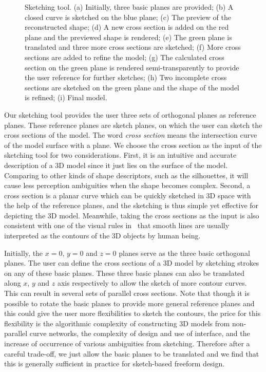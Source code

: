 \begin{figure} [htbp]
{\begin{minipage}[b]{0.26\textwidth}
    \end{minipage}}
  \caption{Sketching tool. (a) Initially, three basic planes are provided; (b) A closed curve is sketched on the blue plane; (c) The preview of the reconstructed shape; (d) A new cross section is added on the red plane and the previewed shape is rendered; (e) The green plane is translated and three more cross sections are sketched; (f) More cross sections are added to refine the model; (g) The calculated cross section on the green plane is rendered semi-transparently to provide the user reference for further sketches; (h) Two incomplete cross sections are sketched on the green plane and the shape of the model is refined; (i) Final model.}
  \label{fig:pig} %
\end{figure}

Our sketching tool provides the user three sets of orthogonal planes
as reference  planes. These reference planes are sketch planes, on
which the user can sketch the cross sections of the model. The word
\textit{cross section} means the intersection curve of the model
surface with a plane. We choose the cross section as the input of
the sketching tool for two considerations. First, it is an intuitive
and accurate description of a 3D model since it just lies on the
surface of the model. Comparing to other kinds of shape descriptors,
such as the silhouettes, it will cause less perception ambiguities
when the shape becomes complex. Second, a cross section is a planar
curve which can be quickly sketched in 3D space with the help of the
reference planes, and the sketching is thus simple yet effective for
depicting the 3D model. Meanwhile, taking the cross sections as the input
is also consistent with one of the visual rules in~\cite{HD00} that smooth
lines are usually interpreted as the contours of the 3D objects by human being.

Initially, the $x=0$, $y=0$ and $z=0$ planes serve as the three
basic orthogonal planes. The user can define the cross sections of a
3D model by sketching strokes on any of these basic planes. These
three basic planes can also be translated along $x$, $y$ and $z$
axis respectively to allow the sketch of more contour curves. This
can result in several sets of parallel cross sections. Note that
though it is possible to rotate the basic planes to provide more
general reference planes and this could give the user more
flexibilities to sketch the contours, the price for this flexibility
is the algorithmic complexity of constructing 3D models from
non-parallel curve networks, the complexity of design and use of
interface, and the increase of occurrence of various ambiguities
from sketching. Therefore after a careful trade-off, we just allow
the basic planes to be translated and we find that this is generally
sufficient in practice for sketch-based freeform design.

